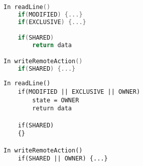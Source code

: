 \par\noindent
\begin{minipage}[t]{.5\textwidth}
\begin{lstlisting}[language=C,frame=lrtb]
In readLine()
	if(MODIFIED) {...}
	if(EXCLUSIVE) {...}

	if(SHARED)
		return data		

In writeRemoteAction()
	if(SHARED) {...}
\end{lstlisting}%
\end{minipage}%
\hfill
\begin{minipage}[t]{.5\textwidth}
\begin{lstlisting}[frame=lrtb]
In readLine()
	if(MODIFIED || EXCLUSIVE || OWNER) 
		state = OWNER
		return data

	if(SHARED)
	{}

In writeRemoteAction()
	if(SHARED || OWNER) {...}
\end{lstlisting}%
\end{minipage}%
